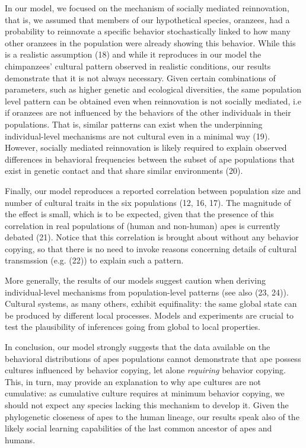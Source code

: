 \documentclass[9pt,twocolumn,twoside,]{pnas-new}
\begin{document}
In our model, we focused on the mechanism of socially mediated
reinnovation, that is, we assumed that members of our hypothetical
species, oranzees, had a probability to reinnovate a specific behavior
stochastically linked to how many other oranzees in the population were
already showing this behavior. While this is a realistic assumption (18)
and while it reproduces in our model the chimpanzees' cultural pattern
observed in realistic conditions, our results demonstrate that it is not
always necessary. Given certain combinations of parameters, such as
higher genetic and ecological diversities, the same population level
pattern can be obtained even when reinnovation is not socially mediated,
i.e if oranzees are not influenced by the behaviors of the other
individuals in their populations. That is, similar patterns can exist
when the underpinning individual-level mechanisms are not cultural even
in a minimal way (19). However, socially mediated reinnovation is likely
required to explain observed differences in behavioral frequencies
between the subset of ape populations that exist in genetic contact and
that share similar environments (20).

Finally, our model reproduces a reported correlation between population
size and number of cultural traits in the six populations (12, 16, 17).
The magnitude of the effect is small, which is to be expected, given
that the presence of this correlation in real populations of (human and
non-human) apes is currently debated (21). Notice that this correlation
is brought about without any behavior copying, so that there is no need
to invoke reasons concerning details of cultural transmssion (e.g. (22))
to explain such a pattern.

More generally, the results of our models suggest caution when deriving
individual-level mechanisms from population-level patterns (see also
(23, 24)). Cultural systems, as many others, exhibit equifinality: the
same global state can be produced by different local processes. Models
and experiments are crucial to test the plausibility of inferences going
from global to local properties.

In conclusion, our model strongly suggests that the data available on
the behavioral distributions of apes populations cannot demonstrate that
ape possess cultures influenced by behavior copying, let alone
\emph{requiring} behavior copying. This, in turn, may provide an
explanation to why ape cultures are not cumulative: as cumulative
culture requires at minimum behavior copying, we should not expect any
species lacking this mechanism to develop it. Given the phylogenetic
closeness of apes to the human lineage, our results speak also of the
likely social learning capabilities of the last common ancestor of apes
and humans.
\end{document}
